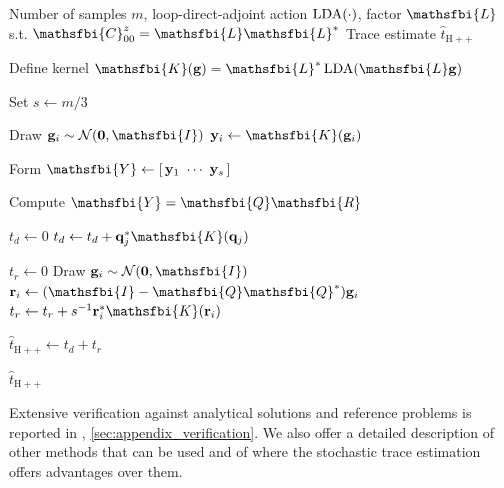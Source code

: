 \begin{algorithm}[htbp]
  \caption{Stochastic stepping trace estimator for \(\tr\left\{\mathsfbi{T}_{t,k}\mathsfbi{C}_{00}^{z}\right\}\)}
  \label{alg:stochastic_stepping_trace_estimator}

  \begin{algorithmic}[1]
    \Require Number of samples \(m\), loop-direct-adjoint action \(\operatorname{LDA}(\cdot)\),
             factor \(\mathsfbi{L}\) s.t.
             \(\mathsfbi{C}_{00}^{z}=\mathsfbi{L}\mathsfbi{L}^{*}\)
    \Ensure Trace estimate \(\widehat{t}_{\mathrm{H++}}\)

    \State Define kernel
      \(\mathsfbi{K}(\mathbf{g})
      =
      \mathsfbi{L}^{*}\LDA(\mathsfbi{L}\mathbf{g})\)

    \State Set \(s \gets m/3\)

      \State Draw \(\mathbf{g}_i \sim \mathcal{N}(\mathbf{0},\mathsfbi{I})\)
      \State \(\mathbf{y}_i \gets \mathsfbi{K}(\mathbf{g}_i)\)
    \EndFor

    \State Form
      \(\mathsfbi{Y}
      \gets
      [\,\mathbf{y}_1\ \cdots\ \mathbf{y}_s\,]\)

    \State Compute
      \(\mathsfbi{Y}=\mathsfbi{Q}\mathsfbi{R}\)

    \State \(t_d \gets 0\)
      \State \(t_d \gets t_d + \mathbf{q}_j^{*}\mathsfbi{K}(\mathbf{q}_j)\)
    \EndFor

    \State \(t_r \gets 0\)
      \State Draw \(\mathbf{g}_i \sim \mathcal{N}(\mathbf{0},\mathsfbi{I})\)
      \State \(\mathbf{r}_i \gets (\mathsfbi{I}-\mathsfbi{Q}\mathsfbi{Q}^{*})\mathbf{g}_i\)
      \State \(t_r \gets t_r + s^{-1}\mathbf{r}_i^{*}\mathsfbi{K}(\mathbf{r}_i)\)
    \EndFor

    \State \(\widehat{t}_{\mathrm{H++}} \gets t_d+t_r\)

    \State \Return \(\widehat{t}_{\mathrm{H++}}\)
  \end{algorithmic}
\end{algorithm}
Extensive verification against analytical solutions and reference problems is reported in , \cref{sec:appendix_verification}. We also offer a detailed description of other methods that can be used and of where the stochastic trace estimation offers advantages over them.
